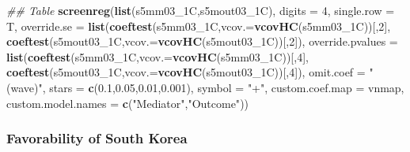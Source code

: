 \documentclass[
]{article}
\newenvironment{Shaded}{\begin{snugshade}}{\end{snugshade}}
\newcommand{\CommentTok}[1]{\textcolor[rgb]{0.56,0.35,0.01}{\textit{#1}}}
\newcommand{\DataTypeTok}[1]{\textcolor[rgb]{0.13,0.29,0.53}{#1}}
\newcommand{\DecValTok}[1]{\textcolor[rgb]{0.00,0.00,0.81}{#1}}
\newcommand{\FloatTok}[1]{\textcolor[rgb]{0.00,0.00,0.81}{#1}}
\newcommand{\KeywordTok}[1]{\textcolor[rgb]{0.13,0.29,0.53}{\textbf{#1}}}
\newcommand{\NormalTok}[1]{#1}
\newcommand{\StringTok}[1]{\textcolor[rgb]{0.31,0.60,0.02}{#1}}
\begin{document}
\begin{Shaded}
\begin{Highlighting}[]
\CommentTok{## Table}
\KeywordTok{screenreg}\NormalTok{(}\KeywordTok{list}\NormalTok{(s5mm03_1C,s5mout03_1C), }\DataTypeTok{digits =} \DecValTok{4}\NormalTok{, }\DataTypeTok{single.row =}\NormalTok{ T,}
          \DataTypeTok{override.se =} \KeywordTok{list}\NormalTok{(}\KeywordTok{coeftest}\NormalTok{(s5mm03_1C,}\DataTypeTok{vcov.=}\KeywordTok{vcovHC}\NormalTok{(s5mm03_1C))[,}\DecValTok{2}\NormalTok{],}
                             \KeywordTok{coeftest}\NormalTok{(s5mout03_1C,}\DataTypeTok{vcov.=}\KeywordTok{vcovHC}\NormalTok{(s5mout03_1C))[,}\DecValTok{2}\NormalTok{]),}
          \DataTypeTok{override.pvalues =} \KeywordTok{list}\NormalTok{(}\KeywordTok{coeftest}\NormalTok{(s5mm03_1C,}\DataTypeTok{vcov.=}\KeywordTok{vcovHC}\NormalTok{(s5mm03_1C))[,}\DecValTok{4}\NormalTok{],}
                                  \KeywordTok{coeftest}\NormalTok{(s5mout03_1C,}\DataTypeTok{vcov.=}\KeywordTok{vcovHC}\NormalTok{(s5mout03_1C))[,}\DecValTok{4}\NormalTok{]),}
          \DataTypeTok{omit.coef =} \StringTok{"(wave)"}\NormalTok{, }\DataTypeTok{stars =} \KeywordTok{c}\NormalTok{(}\FloatTok{0.1}\NormalTok{,}\FloatTok{0.05}\NormalTok{,}\FloatTok{0.01}\NormalTok{,}\FloatTok{0.001}\NormalTok{), }\DataTypeTok{symbol =} \StringTok{"+"}\NormalTok{,}
          \DataTypeTok{custom.coef.map =}\NormalTok{ vnmap, }
          \DataTypeTok{custom.model.names =} \KeywordTok{c}\NormalTok{(}\StringTok{"Mediator"}\NormalTok{,}\StringTok{"Outcome"}\NormalTok{))}
\end{Highlighting}
\end{Shaded}

\hypertarget{favorability-of-south-korea}{%
\subsubsection{Favorability of South
Korea}\label{favorability-of-south-korea}}
\end{document}
